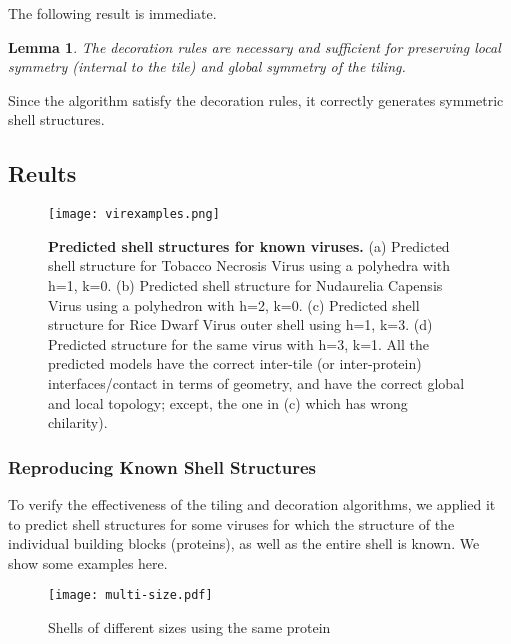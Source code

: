 \documentclass[11pt]{article}
\def\func#1{\textrm{\bf{\sc{#1}}}}
\newtheorem{lemma}[thm]{Lemma}
\newcommand{\1}{\mathds{1}}
\begin{document}
The following result is immediate.

\begin{lemma}
 The decoration rules are necessary and sufficient for preserving local symmetry (internal to the tile) and global symmetry of the tiling.
\end{lemma}

Since the \func{ShellGen} algorithm satisfy the decoration rules, it correctly generates symmetric shell structures.


\subsection{Reults}

\begin{figure}[t!]
\centering
\vspace{-0.3cm}
 \texttt{[image: virexamples.png]}
\vspace{-0.2cm}
\caption[Predicted shell structures for known viruses] {\textbf{Predicted shell structures for known viruses.} (a) Predicted shell structure for Tobacco Necrosis Virus using a polyhedra with h=1, k=0. (b) Predicted shell structure for Nudaurelia Capensis Virus using a polyhedron with h=2, k=0. (c) Predicted shell structure for Rice Dwarf Virus outer shell using h=1, k=3. (d) Predicted structure for the same virus with h=3, k=1. All the predicted models have the correct inter-tile (or inter-protein) interfaces/contact in terms of geometry, and have the correct global and local topology; except, the one in (c) which has wrong chilarity).}
\vspace{-0.5cm}
\label{fig:assemblytheory:demo}
\end{figure}

\vspace{-0.5cm}
\subsubsection{Reproducing Known Shell Structures}
To verify the effectiveness of the tiling and decoration algorithms, we applied it to predict shell structures for some viruses for which the structure of the individual building blocks (proteins), as well as the entire shell is known. We show some examples here. 

\begin{figure}[t!]
\centering
 \texttt{[image: multi-size.pdf]}
\caption[Shells of different sizes using the same protein] {Shells of different sizes using the same protein}
\label{fig:virus:sizes}
\end{figure}
\end{document}
